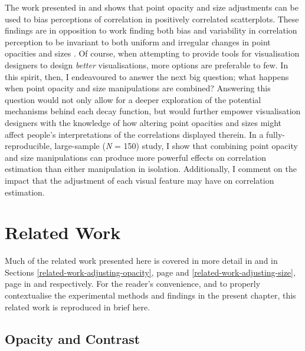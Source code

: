 \documentclass[../main.tex]{subfiles}
\begin{document}
The work presented in  and
 shows that point opacity and size adjustments
can be used to bias perceptions of correlation in positively correlated
scatterplots. These findings are in opposition to work finding both bias
and variability in correlation perception to be invariant to both
uniform and irregular changes in point opacities and sizes
\cite{rensink_2012, rensink_2014}. Of course, when attempting to provide
tools for visualisation designers to design \emph{better}
visualisations, more options are preferable to few. In this spirit,
then, I endeavoured to answer the next big question; what happens when
point opacity and size manipulations are combined? Answering this
question would not only allow for a deeper exploration of the potential
mechanisms behind each decay function, but would further empower
visualisation designers with the knowledge of how altering point
opacities and sizes might affect people's interpretations of the
correlations displayed therein. In a fully-reproducible, large-sample
(\emph{N} = 150) study, I show that combining point opacity and size
manipulations can produce more powerful effects on correlation
estimation than either manipulation in isolation. Additionally, I
comment on the impact that the adjustment of each visual feature may
have on correlation estimation.

\section{Related Work}\label{related-work-interactions}

Much of the related work presented here is covered in more detail in
 and in Sections
\ref{related-work-adjusting-opacity}, page
\pageref{related-work-adjusting-opacity} and
\ref{related-work-adjusting-size}, page
\pageref{related-work-adjusting-size} in 
and  respectively. For the reader's
convenience, and to properly contextualise the experimental methods and
findings in the present chapter, this related work is reproduced in
brief here.

\subsection{Opacity and Contrast}\label{opacity-and-contrast}
\end{document}
